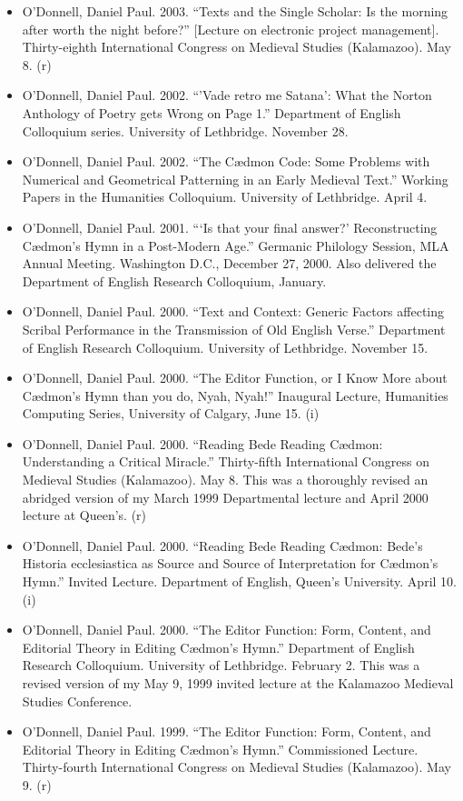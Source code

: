 \documentclass[12pt]{article}
\begin{document}
\begin{itemize}
  \item O'Donnell, Daniel Paul. 2003. “Texts and the Single Scholar: Is the morning after worth the night before?” [Lecture on electronic project management]. Thirty-eighth International Congress on Medieval Studies (Kalamazoo). May 8. (r)
  \item O'Donnell, Daniel Paul. 2002. “'Vade retro me Satana': What the Norton Anthology of Poetry gets Wrong on Page 1.” Department of English Colloquium series. University of Lethbridge. November 28.
  \item O'Donnell, Daniel Paul. 2002. “The Cædmon Code: Some Problems with Numerical and Geometrical Patterning in an Early Medieval Text.” Working Papers in the Humanities Colloquium. University of Lethbridge. April 4.
  \item O'Donnell, Daniel Paul. 2001. “‘Is that your final answer?’ Reconstructing Cædmon’s Hymn in a Post-Modern Age.” Germanic Philology Session, MLA Annual Meeting. Washington D.C., December 27, 2000. Also delivered the Department of English Research Colloquium, January.
  \item O'Donnell, Daniel Paul. 2000. “Text and Context: Generic Factors affecting Scribal Performance in the Transmission of Old English Verse.” Department of English Research Colloquium. University of Lethbridge. November 15.
  \item O'Donnell, Daniel Paul. 2000. “The Editor Function, or I Know More about Cædmon’s Hymn than you do, Nyah, Nyah!” Inaugural Lecture, Humanities Computing Series, University of Calgary, June 15. (i)
  \item O'Donnell, Daniel Paul. 2000. “Reading Bede Reading Cædmon: Understanding a Critical Miracle.” Thirty-fifth International Congress on Medieval Studies (Kalamazoo). May 8. This was a thoroughly revised an abridged version of my March 1999 Departmental lecture and April 2000 lecture at Queen’s. (r)
  \item O'Donnell, Daniel Paul. 2000. “Reading Bede Reading Cædmon: Bede’s Historia ecclesiastica as Source and Source of Interpretation for Cædmon’s Hymn.” Invited Lecture. Department of English, Queen’s University. April 10. (i)
  \item O'Donnell, Daniel Paul. 2000. “The Editor Function: Form, Content, and Editorial Theory in Editing Cædmon’s Hymn.” Department of English Research Colloquium. University of Lethbridge. February 2. This was a revised version of my May 9, 1999 invited lecture at the Kalamazoo Medieval Studies Conference.
  \item O'Donnell, Daniel Paul. 1999. “The Editor Function: Form, Content, and Editorial Theory in Editing Cædmon’s Hymn.” Commissioned Lecture. Thirty-fourth International Congress on Medieval Studies (Kalamazoo). May 9. (r)

\end{itemize}
\end{document}
